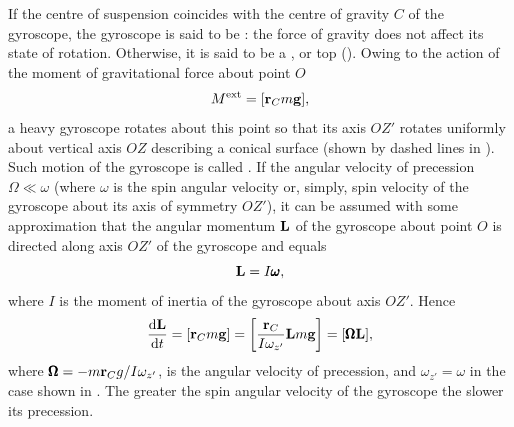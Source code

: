 If the centre of suspension coincides with the centre of gravity $C$  of the gyroscope, the gyroscope is said to be : the force of gravity does not affect its state of rotation. Otherwise, it is said to be a , or top (). Owing to the action of the moment of gravitational force about point $O$
\begin{equation*}%
M^{\textrm{ext}} = \qty[\vb{r}_{C}m \vb{g}],
\end{equation*}
a heavy gyroscope rotates about this point so that its axis $OZ'$ rotates uni­formly about vertical axis $OZ$ describ­ing a conical surface (shown by dashed lines in ). Such motion of the gyroscope is called . If the angular velocity of precession $\Omega \ll \omega$ (where $\omega$ is the spin angular velocity or, simply, spin velocity of the gyroscope about its axis of symmetry $OZ'$), it can be assumed with some approximation that the angular momentum $\vb{L}$ of the gyroscope about point $O$ is directed along axis $OZ'$ of the gyroscope and equals
\begin{equation*}%
\vb{L} = I \pmb{\omega},
\end{equation*}
where $I$ is the moment of inertia of the gyroscope about axis $OZ'$. Hence
\begin{equation*}%
\dv{\vb{L}}{t} = \qty[\vb{r}_{C}m\vb{g}] = \qty[\frac{\vb{r}_{C}}{I \omega_{z'}} \vb{L} m\vb{g}] = \qty[\pmb{\Omega}\vb{L}],
\end{equation*}
where $\pmb{\Omega} = - m\vb{r}_{C}g/I\omega_{z'}$, is the angular velocity of precession, and $\omega_{z'} = \omega$ in the case shown in . The greater the spin angular velocity of the gyroscope the slower its precession. 

